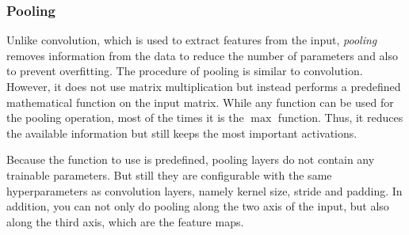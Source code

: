 \subsubsection{Pooling}
Unlike convolution, which is used to extract features from the input, \emph{pooling} removes information from the data to reduce the number of parameters and also to prevent overfitting. The procedure of pooling is similar to convolution. However, it does not use matrix multiplication but instead performs a predefined mathematical function on the input matrix. While any function can be used for the pooling operation, most of the times it is the $\max$ function. Thus, it reduces the available information but still keeps the most important activations.~\cite[p.~369 f]{praxiseinstieg_ml17}

Because the function to use is predefined, pooling layers do not contain any trainable parameters. But still they are configurable with the same hyperparameters as convolution layers, namely kernel size, stride and padding. In addition, you can not only do pooling along the two axis of the input, but also along the third axis, which are the feature maps.~\cite[p.~370]{praxiseinstieg_ml17}

